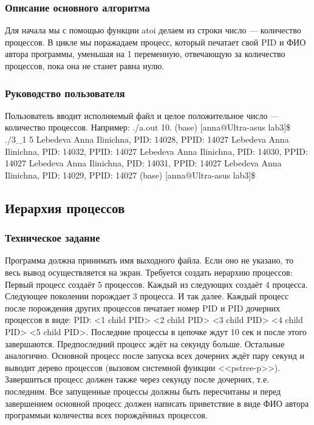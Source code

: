 \documentclass[a4paper,12pt]{extarticle}
\begin{document}
\subsubsection{Описание основного алгоритма}
Для начала мы с помощью функции atoi делаем из строки число --- количество процессов. В цикле мы поражадаем процесс, который печатает свой PID и ФИО автора программы, уменьшая на 1 переменную, отвечающую за количество процессов, пока она не станет равна нулю.

\subsubsection{Руководство пользователя}
Пользователь вводит исполняемый файл и целое положительное число --- количество процессов. Например: ./a.out 10.
(base) [anna@Ultra-asus lab3]\$ ./3\_1 5 \newline
Lebedeva Anna Ilinichna, PID: 14028, PPID: 14027 \newline
Lebedeva Anna Ilinichna, PID: 14032, PPID: 14027 \newline
Lebedeva Anna Ilinichna, PID: 14030, PPID: 14027 \newline
Lebedeva Anna Ilinichna, PID: 14031, PPID: 14027 \newline
Lebedeva Anna Ilinichna, PID: 14029, PPID: 14027 \newline
(base) [anna@Ultra-asus lab3]\$\newline

\subsection{Иерархия процессов}
\subsubsection{Техническое задание}
Программа должна принимать имя выходного файла. Если оно не указано, то весь вывод осуществляется на экран. Требуется создать иерархию процессов: Первый процесс создаёт 5 процессов. Каждый из следующих создаёт 4 процесса. Следующее поколении порождает 3 процесса. И так далее. Каждый процесс после порождения других процессов печатает номер PID и PID дочерних процессов в виде: PID: <1 child PID> <2 child PID> <3 child PID> <4 child PID> <5 child PID>. Последние процессы в цепочке ждут 10 сек и после этого завершаются.    Предпоследний процесс ждёт на секунду больше. Остальные аналогично. Основной  процесс после  запуска  всех  дочерних  ждёт  пару  секунд  и выводит   дерево   процессов (вызовом системной функции <<pstree-p>>). Завершиться процесс должен также через секунду после дочерних, т.е. последним. Все запущенные  процессы  должны  быть  пересчитаны и  перед завершением основной  процесс  должен написать приветствие  в  виде  ФИО автора программыи количества всех порождённых процессов.
\end{document}
